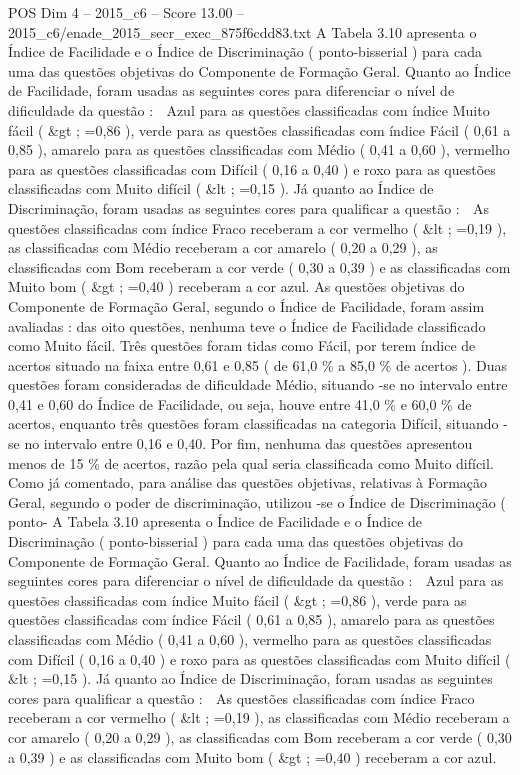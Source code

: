 \begin{textsample}{POS Dim 4 – 2015\_c6 – Score 13.00 – 2015\_c6/enade\_2015\_secr\_exec\_875f6cdd83.txt}
A Tabela 3.10 apresenta o Índice de Facilidade e o Índice de Discriminação ( ponto-bisserial ) para cada uma das questões objetivas do Componente de Formação Geral.
Quanto ao Índice de Facilidade, foram usadas as seguintes cores para diferenciar o nível de dificuldade da questão :  Azul para as questões classificadas com índice Muito fácil ( \&gt ; =0,86 ), verde para as questões classificadas com índice Fácil ( 0,61 a 0,85 ), amarelo para as questões classificadas com Médio ( 0,41 a 0,60 ), vermelho para as questões classificadas com Difícil ( 0,16 a 0,40 ) e roxo para as questões classificadas com Muito difícil ( \&lt ; =0,15 ).
Já quanto ao Índice de Discriminação, foram usadas as seguintes cores para qualificar a questão :  As questões classificadas com índice Fraco receberam a cor vermelho ( \&lt ; =0,19 ), as classificadas com Médio receberam a cor amarelo ( 0,20 a 0,29 ), as classificadas com Bom receberam a cor verde ( 0,30 a 0,39 ) e as classificadas com Muito bom ( \&gt ; =0,40 ) receberam a cor azul.
As questões objetivas do Componente de Formação Geral, segundo o Índice de Facilidade, foram assim avaliadas : das oito questões, nenhuma teve o Índice de Facilidade classificado como Muito fácil.
Três questões foram tidas como Fácil, por terem índice de acertos situado na faixa entre 0,61 e 0,85 ( de 61,0 \% a 85,0 \% de acertos ).
Duas questões foram consideradas de dificuldade Médio, situando -se no intervalo entre 0,41 e 0,60 do Índice de Facilidade, ou seja, houve entre 41,0 \% e 60,0 \% de acertos, enquanto três questões foram classificadas na categoria Difícil, situando -se no intervalo entre 0,16 e 0,40.
Por fim, nenhuma das questões apresentou menos de 15 \% de acertos, razão pela qual seria classificada como Muito difícil.
Como já comentado, para análise das questões objetivas, relativas à Formação Geral, segundo o poder de discriminação, utilizou -se o Índice de Discriminação ( ponto- A Tabela 3.10 apresenta o Índice de Facilidade e o Índice de Discriminação ( ponto-bisserial ) para cada uma das questões objetivas do Componente de Formação Geral.
Quanto ao Índice de Facilidade, foram usadas as seguintes cores para diferenciar o nível de dificuldade da questão :  Azul para as questões classificadas com índice Muito fácil ( \&gt ; =0,86 ), verde para as questões classificadas com índice Fácil ( 0,61 a 0,85 ), amarelo para as questões classificadas com Médio ( 0,41 a 0,60 ), vermelho para as questões classificadas com Difícil ( 0,16 a 0,40 ) e roxo para as questões classificadas com Muito difícil ( \&lt ; =0,15 ).
Já quanto ao Índice de Discriminação, foram usadas as seguintes cores para qualificar a questão :  As questões classificadas com índice Fraco receberam a cor vermelho ( \&lt ; =0,19 ), as classificadas com Médio receberam a cor amarelo ( 0,20 a 0,29 ), as classificadas com Bom receberam a cor verde ( 0,30 a 0,39 ) e as classificadas com Muito bom ( \&gt ; =0,40 ) receberam a cor azul.

\end{textsample}
